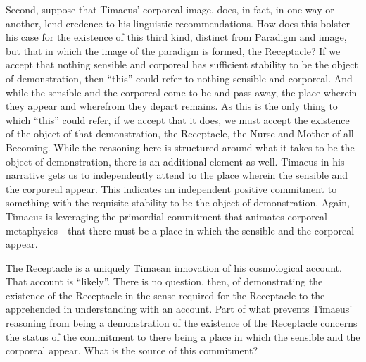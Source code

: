 Second, suppose that Timaeus' corporeal image, does, in fact, in one way or another, lend credence to his linguistic recommendations. How does this bolster his case for the existence of this third kind, distinct from Paradigm and image, but that in which the image of the paradigm is formed, the Receptacle? If we accept that nothing sensible and corporeal has sufficient stability to be the object of demonstration, then ``this'' could refer to nothing sensible and corporeal. And while the sensible and the corporeal come to be and pass away, the place wherein they appear and wherefrom they depart remains. As this is the only thing to which ``this'' could refer, if we accept that it does, we must accept the existence of the object of that demonstration, the Receptacle, the Nurse and Mother of all Becoming. While the reasoning here is structured around what it takes to be the object of demonstration, there is an additional element as well. Timaeus in his narrative gets us to independently attend to the place wherein the sensible and the corporeal appear. This indicates an independent positive commitment to something with the requisite stability to be the object of demonstration. Again, Timaeus is leveraging the primordial commitment that animates corporeal metaphysics---that there must be a place in which the sensible and the corporeal appear.

The Receptacle is a uniquely Timaean innovation of his cosmological account. That account is ``likely''. There is no question, then, of demonstrating the existence of the Receptacle in the sense required for the Receptacle to the apprehended in understanding with an account. Part of what prevents Timaeus' reasoning from being a demonstration of the existence of the Receptacle concerns the status of the commitment to there being a place in which the sensible and the corporeal appear. What is the source of this commitment? 

